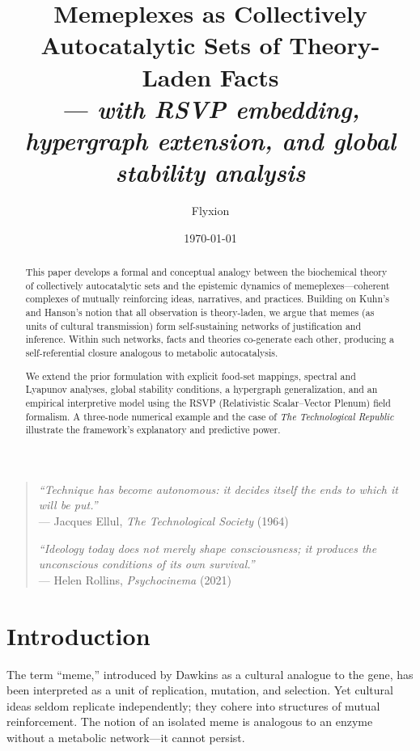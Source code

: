 \documentclass[11pt,a4paper]{article}
\title{\Large\bfseries Memeplexes as Collectively Autocatalytic Sets of Theory-Laden Facts\\
\large\itshape — with RSVP embedding, hypergraph extension, and global stability analysis}
\author{Flyxion}
\date{\today}
\newenvironment{narrative}{\begin{itshape}}{\end{itshape}}
\begin{document}
\maketitle

\begin{center}
\begin{quote}
\textit{“Technique has become autonomous: it decides itself the ends to which it will be put.”}\\
— Jacques Ellul, \textit{The Technological Society} (1964)

\vspace{0.8em}
\textit{“Ideology today does not merely shape consciousness; it produces the unconscious conditions of its own survival.”}\\
— Helen Rollins, \textit{Psychocinema} (2021)
\end{quote}
\end{center}

\begin{abstract}
This paper develops a formal and conceptual analogy between the biochemical theory of collectively autocatalytic sets and the epistemic dynamics of memeplexes—coherent complexes of mutually reinforcing ideas, narratives, and practices. Building on Kuhn’s and Hanson’s notion that all observation is theory-laden, we argue that memes (as units of cultural transmission) form self-sustaining networks of justification and inference. Within such networks, facts and theories co-generate each other, producing a self-referential closure analogous to metabolic autocatalysis.

We extend the prior formulation with explicit food-set mappings, spectral and Lyapunov analyses, global stability conditions, a hypergraph generalization, and an empirical interpretive model using the RSVP (Relativistic Scalar–Vector Plenum) field formalism. A three-node numerical example and the case of \textit{The Technological Republic} illustrate the framework’s explanatory and predictive power.
\end{abstract}

\section{Introduction}
\begin{narrative}
The term “meme,” introduced by Dawkins as a cultural analogue to the gene, has been interpreted as a unit of replication, mutation, and selection. Yet cultural ideas seldom replicate independently; they cohere into structures of mutual reinforcement. The notion of an isolated meme is analogous to an enzyme without a metabolic network—it cannot persist. 
\end{narrative}
\end{document}

